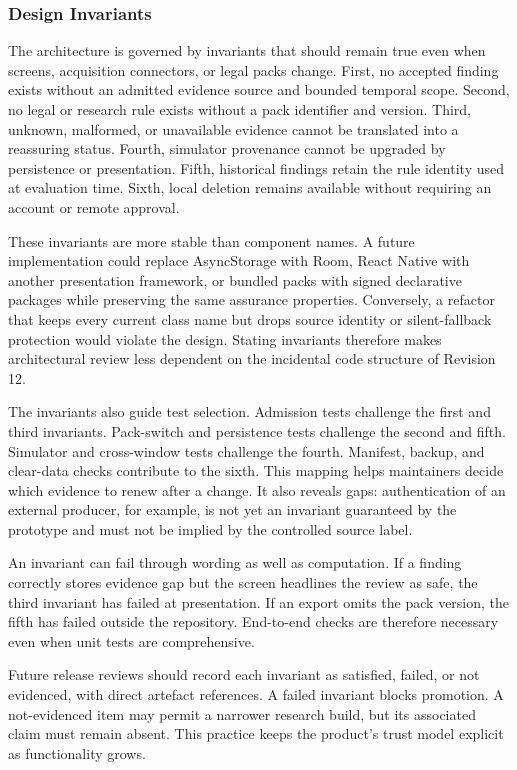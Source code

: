 \subsubsection{Design Invariants}

The architecture is governed by invariants that should remain true even when screens, acquisition connectors, or legal packs change. First, no accepted finding exists without an admitted evidence source and bounded temporal scope. Second, no legal or research rule exists without a pack identifier and version. Third, unknown, malformed, or unavailable evidence cannot be translated into a reassuring status. Fourth, simulator provenance cannot be upgraded by persistence or presentation. Fifth, historical findings retain the rule identity used at evaluation time. Sixth, local deletion remains available without requiring an account or remote approval.

These invariants are more stable than component names. A future implementation could replace AsyncStorage with Room, React Native with another presentation framework, or bundled packs with signed declarative packages while preserving the same assurance properties. Conversely, a refactor that keeps every current class name but drops source identity or silent-fallback protection would violate the design. Stating invariants therefore makes architectural review less dependent on the incidental code structure of Revision 12.

The invariants also guide test selection. Admission tests challenge the first and third invariants. Pack-switch and persistence tests challenge the second and fifth. Simulator and cross-window tests challenge the fourth. Manifest, backup, and clear-data checks contribute to the sixth. This mapping helps maintainers decide which evidence to renew after a change. It also reveals gaps: authentication of an external producer, for example, is not yet an invariant guaranteed by the prototype and must not be implied by the controlled source label.

An invariant can fail through wording as well as computation. If a finding correctly stores evidence gap but the screen headlines the review as safe, the third invariant has failed at presentation. If an export omits the pack version, the fifth has failed outside the repository. End-to-end checks are therefore necessary even when unit tests are comprehensive.

Future release reviews should record each invariant as satisfied, failed, or not evidenced, with direct artefact references. A failed invariant blocks promotion. A not-evidenced item may permit a narrower research build, but its associated claim must remain absent. This practice keeps the product's trust model explicit as functionality grows.

